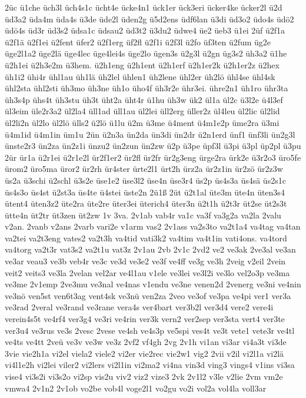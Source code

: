 {2üc
ü1che
üch3l
üch4s1c
ücht4e
ücke4n1
ück1er
ück3eri
ücker4ke
ücker2l
ü2d
üd3a2
üda4m
üda4s
ü3de
üde2l
üden2g
ü5d2ens
üdf6lan
ü3di
üd3o2
üdo4s
üdö2
üdö4s
üd3r
üd3s2
üdsa1c
üdsau2
üd3t2
ü3du2
üdwe4
üe2
üeb3
ü1ei
2üf
ü2f1a
ü2f1ä
ü2f1ei
ü2fent
üfer2
ü2f1erg
üf2fl
ü2f1i
ü2f3l
ü2fo
üf3ten
ü2fum
üg2e
üge2l1a2
üge2lä
üge4lec
üge4lei4s
üge2lo
ügen3s
ü2g3l
ü2gn
üg3s2
üh3a2
ü1he
ü2h1ei
ü2h3e2m
ü3hem.
ü2h1eng
ü2h1ent
ü2h1erf
ü2h1er2k
ü2h1er2z
ü2hex
üh1i2
ühi4r
ühl1au
üh1lä
üh2lel
ühlen1
üh2lene
ühl2er
üh2lö
ühl4se
ühl4sk
ühl2sta
ühl2sti
üh3mo
üh3ne
üh1o
üho4f
üh3r2e
ühr3ei.
ühre2n1
üh1ro
ühr3ta
üh3s4p
ühs4t
üh3stu
üh3t
üht2a
üht4r
ü1hu
üh3w
ük2
ül1a
ül2c
ü3l2e
ü4l3ef
ül3eim
üle2r3a2
ül2la4
üll1ad
üll1au
ül2lei
üll2erg
üller2z
ül4leu
ül2lic
ül2lid
ül2li2n
ül2lo
ül2lö
ülls2
ü2lö
ü1lu
ü2m
ü3me
ü4ment
ü4m1e2p
üme2ra
ü3mi
ü4m1id
ü4m1in
üm1u
2ün
ü2n3a
ün2da
ün3di
ün2dr
ü2n1erd
ünf1
ünf3li
ün2g3l
ünste2r3
ün2za
ün2z1i
ünzu2
ün2zun
ün2zw
ü2p
ü3pe
üpf3l
ü3pi
ü3pl
üp2pl
ü3pu
2ür
ür1a
ü2r1ei
ü2r1e2l
ür2f1er2
ür2fl
ür2fr
ür2g3eng
ürge2ra
ürk2e
ü3r2o3
üro5fe
ürom2
üro5ma
üror2
ür2rh
ür4ster
ürte2l1
ürt2h
ürz2a
ür2z1in
ür2zö
ür2z3w
üs2a
ü3schi
ü2schl
ü3s2e
üse1e2
üse3l2
üse4n
üse3r4
üs2p
üs4s3a
üs4sä
üs2s1c
üs4s3o
üs4st
ü2st3a
üs4te
ü4stei
üste2n
2ü1ß
2üt
ü2t1al
üte3m
üte4n
üten3s4
ütent4
üten3z2
üte2ra
üte2re
üter3ei
üterich4
üter3n
ü2t1h
ü2t3r
üt2se
üt2s3t
ütte4n
üt2tr
üt3zen
üt2zw
1v
3va.
2v1ab
vab4r
va1c
va3f
va3g2a
va2la
2valu
v2an.
2vanb
v2ans
2varb
vari2e
v1arm
vas2
2v1ass
va2s3to
va2t1a4
va4tag
va4tan
va2tei
va2t3eng
vates2
va2t3h
va4tid
vati3k2
va4tim
va4t1in
vati4ons.
va4tord
va4torg
va2t3r
vat3s2
va2t1u
vat3z
2v1au
2vb
2v1c
2vd2
ve2
ve3ak
2ve3al
ve3an
ve3ar
veau3
ve3b
veb4r
ve3c
ve3d
ve3e2
ve3f
ve4ff
ve3g
ve3h
2veig
v2eil
2vein
veit2
veits3
ve3la
2velan
vel2ar
ve4l1au
v1ele
ve3lei
ve3l2i
ve3lo
vel2o3p
ve3ma
ve3me
2v1emp
2ve3mu
ve3nal
ve4nas
v1endu
ve3ne
venen2d
2venerg
ve3ni
ve4nin
ve3nö
ven5st
ven6t3ag
vent4sk
ve3nü
ven2za
2veo
ve3of
ve3pa
ve4pi
ver1
ver3a
ve3rad
2veral
ve3rand
ve3rane
vera4s
ver4bart
ver3b2l
ver3d4
vere2
vere4i
verein4s5t
ve4rf4
ver3g4
ve3ri
ve4rin
ver3k
vern2
ver2sep
ver3sta
vert4
ver3te
ver3u4
ve3rus
ve3s
2vesc
2vese
ve4sh
ve4s3p
ve5spi
ves4t
ve3t
vete1
vete3r
ve4tl
ve4ts
ve4tt
2veü
ve3v
ve3w
ve3z
2vf2
vf4gh
2vg
2v1h
vi1an
vi3ar
vi4a3t
vi3de
3vie
vie2h1a
vi2el
viela2
viele2
vi2er
vie2rec
vie2w1
vig2
2vii
v2il
vi2l1a
vi2lä
vi4l1e2h
vi2lei
viler2
vi2lers
vi2l1in
vi2ma2
vi4na
vin3d
ving3
vings4
v1ins
vi3sa
vise4
vi3s2i
vi3s2o
vi2sp
vis2u
viv2
viz2
vize3
2vk
2v1l2
v3le
v2lie
2vm
vm2e
vmwa4
2v1n2
2v1ob
vo2be
vob4l
voge2l1
vo2gu
vo2i
vol2a
vol4la
voll3ar
}
